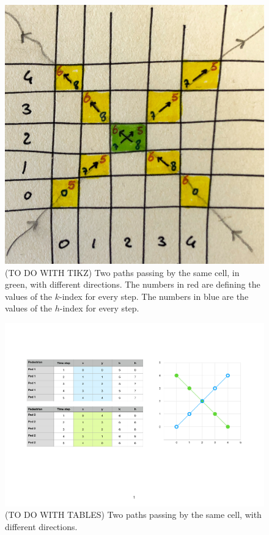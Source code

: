 \documentclass[class=article, crop=false]{standalone}
\begin{document}
\begin{figure}[h]
\centering
\includegraphics[scale=0.1]{draw/eg_distribution_two_trajectories_1}
\captionsetup{width=.7\linewidth}
\caption{(TO DO WITH TIKZ) Two paths passing by the same cell, in green, with different directions.
The numbers in red are defining the values of the $k$-index for every step.
The numbers in blue are the values of the $h$-index for every step.}
\label{fig:two_trj_same_cell}
\end{figure}
\begin{figure}[h]
\centering
\includegraphics[scale=0.5]{draw/eg_distribution_two_trajectories_2}
\captionsetup{width=.7\linewidth}
\caption{(TO DO WITH TABLES) Two paths passing by the same cell, with different directions.}
\label{table:two_trj_same_cell}
\end{figure}
\end{document}
